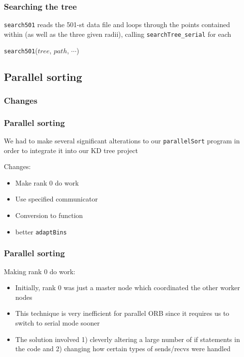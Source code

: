 \documentclass[usernames,dvipsnames]{beamer}
\begin{document}
\begin{frame}
	\frametitle{Searching the tree}
	
	\texttt{search501} reads the 501-st data file and loops through the points contained within (as well as the three given radii), calling \texttt{searchTree\_serial} for each
	
	\vspace{10pt}
	
	\begin{algorithm}[H]
		\begin{algorithmic}[1]
			\STATE 
		\end{algorithmic}
		\caption{\texttt{search501}($tree$, $path$, $\cdots$)}
	\end{algorithm}
		
\end{frame}


\subsection{Parallel sorting}


\subsubsection{Changes}

\begin{frame}
	\frametitle{Parallel sorting}
	
	We had to make several significant alterations to our \texttt{parallelSort} program in order to integrate it into our KD tree project
	
	\vspace{10pt}
	
	\begin{block}{Changes:}
		\begin{itemize}
			\item Make rank 0 do work
			\item Use specified communicator
			\item Conversion to function
			\item better \texttt{adaptBins}
		\end{itemize}
	\end{block}
\end{frame}

\begin{frame}
	\frametitle{Parallel sorting}
	
	\begin{block}{Making rank 0 do work:}
		\begin{itemize}
			\item Initially, rank 0 was just a master node which coordinated the other worker nodes
			\item This technique is very inefficient for parallel ORB since it requires us to switch to serial mode sooner
			\item The solution involved 1) cleverly altering a large number of if statements in the code and 2) changing how certain types of sends/recvs were handled
		\end{itemize}
	\end{block}
\end{frame}
\end{document}
